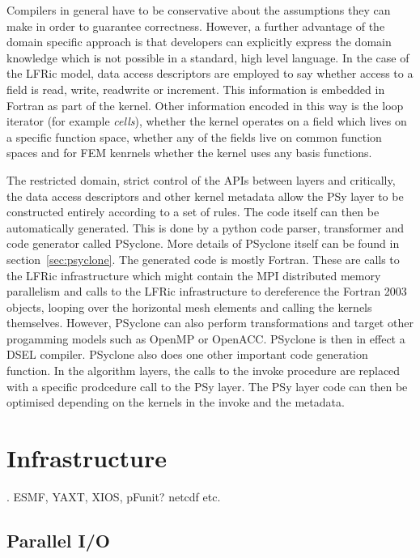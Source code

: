 \documentclass[times]{elsarticle}
\begin{document}
Compilers in general have to be conservative about the assumptions
they can make in order to guarantee correctness. However, a further
advantage of the domain specific approach is that developers can
explicitly express the domain knowledge which is not possible in a
standard, high level language. In the case of the LFRic model, data
access descriptors are employed to say whether access to a field is
read, write, readwrite or increment. This information is embedded in
Fortran as part of the kernel. Other information encoded in this way
is the loop iterator (for example {\em cells}), whether the kernel
operates on a field which lives on a specific function space, whether
any of the fields live on common function spaces and for FEM kenrnels
whether the kernel uses any basis functions. 

The restricted domain, strict control of the APIs between layers and
critically, the data access descriptors and other kernel metadata
allow the PSy layer to be constructed entirely according to a set of
rules. The code itself can then be automatically generated. This is
done by a python code parser, transformer and code generator called
PSyclone. More details of PSyclone itself can be found in
section~\ref{sec:psyclone}. The generated code is mostly Fortran.
These are calls to the LFRic infrastructure which might contain the MPI
distributed memory parallelism and calls to the LFRic infrastructure to dereference the Fortran 2003
objects, looping over the horizontal mesh elements and calling the
kernels themselves. However, PSyclone can also perform transformations
and target other progamming models such as OpenMP or OpenACC. PSyclone
is then in effect a DSEL compiler. PSyclone also does one other
important code generation function. In the algorithm layers, the calls
to the invoke procedure are replaced with a specific prodcedure call
to the PSy layer. The PSy layer code can then be optimised depending on
the kernels in the invoke and the metadata. 

\section{\label{sec:lib}Infrastructure}.
ESMF, YAXT, XIOS, pFunit? netcdf etc.

\subsection{\label{sec:io}Parallel I/O}
\end{document}
